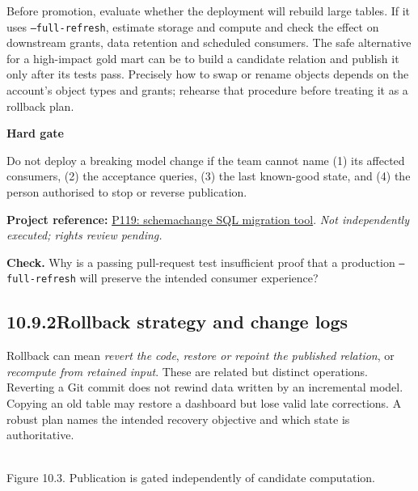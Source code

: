 \documentclass[11pt,twoside]{article}
\newcommand{\topic}[2]{\subsection*{#1\quad #2}}
\newcommand{\repo}[2]{\par\begingroup\fontsize{8.0}{9.6}\selectfont\sffamily\color{inkgray}\textbf{Project reference:} \href{#2}{#1}. \textit{Not independently executed; rights review pending.}\par\endgroup}
\begin{document}
Before promotion, evaluate whether the deployment will rebuild large tables. If it uses \texttt{--full-refresh}, estimate storage and compute and check the effect on downstream grants, data retention and scheduled consumers. The safe alternative for a high-impact gold mart can be to build a candidate relation and publish it only after its tests pass. Precisely how to swap or rename objects depends on the account's object types and grants; rehearse that procedure before treating it as a rollback plan.
\begin{whitebox}\textbf{Hard gate}\par
Do not deploy a breaking model change if the team cannot name (1) its affected consumers, (2) the acceptance queries, (3) the last known-good state, and (4) the person authorised to stop or reverse publication.\end{whitebox}
\repo{P119: schemachange SQL migration tool}{https://github.com/Snowflake-Labs/schemachange}
\textbf{Check.} Why is a passing pull-request test insufficient proof that a production \texttt{--full-refresh} will preserve the intended consumer experience?
\newpage
\topic{10.9.2}{Rollback strategy and change logs}
Rollback can mean \emph{revert the code}, \emph{restore or repoint the published relation}, or \emph{recompute from retained input}. These are related but distinct operations. Reverting a Git commit does not rewind data written by an incremental model. Copying an old table may restore a dashboard but lose valid late corrections. A robust plan names the intended recovery objective and which state is authoritative.
\begin{center}\\{\fontsize{8}{9}\selectfont\color{inkgray}Figure 10.3. Publication is gated independently of candidate computation.}\end{center}
\end{document}
